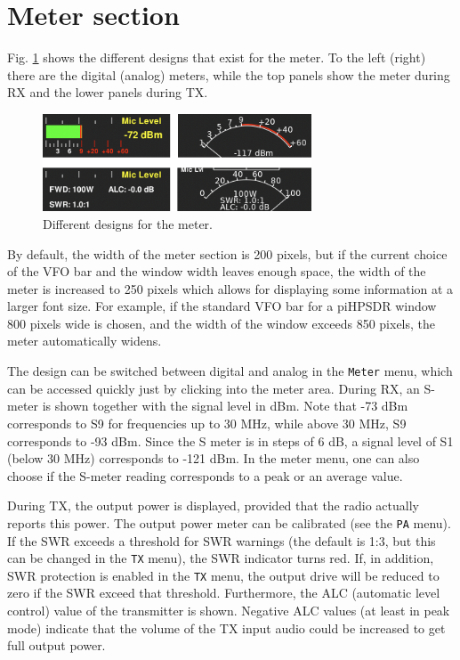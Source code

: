 \documentclass[12pt]{book}
\def\bltt#1{\texttt{\color{blue}#1}}
\def\pH{pi\-HPSDR\xspace}
\begin{document}
\section{Meter section}
\label{sec:MeterSection}
Fig. \ref{fig:MeterDesigns} shows the different designs that exist for
the meter. To the left (right) there are the digital (analog) meters,
while the top panels show the meter during RX and the lower panels
during TX.

\begin{figure}[ht]
\center
\includegraphics[width=8cm]{MeterDesigns.png}
\caption{Different designs for the meter.}
\label{fig:MeterDesigns}
\end{figure}

By default, the width of the meter section is 200 pixels, but if the current
choice of the VFO bar and the window width leaves enough space, the width
of the meter is increased to 250 pixels which allows for displaying some information
at a larger font size. For example, if the standard VFO bar for a \pH
window 800 pixels wide is chosen, and the width of the window exceeds 850
pixels, the meter automatically widens.

The design can be switched between digital and analog in the \bltt{Meter}
menu, which can be accessed quickly just by clicking into the meter area.
During RX, an S-meter is shown together with the signal level in dBm. Note
that -73 dBm corresponds to S9 for frequencies up to 30 MHz, while above
30 MHz, S9 corresponds to -93 dBm. Since the S meter is in steps of
6 dB, a signal level of S1 (below 30 MHz) corresponds to -121 dBm. In the
meter menu, one can also choose if the S-meter reading corresponds to a peak
or  an average value.

During TX, the output power is displayed, provided that the radio actually
reports this power. The output power meter can be calibrated (see the \bltt{PA}
menu). If the SWR exceeds a threshold for SWR warnings (the default is 1:3, but
this can be changed in the \bltt{TX} menu), the SWR indicator turns red. If,
in addition, SWR protection is enabled in the \bltt{TX} menu, the output
drive  will be reduced to zero if the SWR exceed that threshold.
Furthermore, the ALC (automatic level control) value of the transmitter is
shown. Negative ALC values (at least in peak mode) indicate that the volume of the TX input audio
could be increased to get full output  power.
\end{document}
